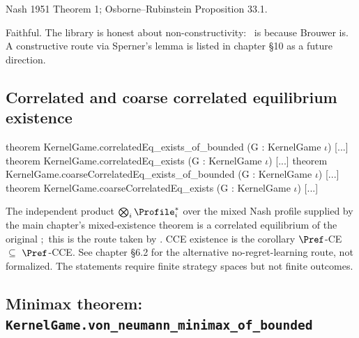 \Textbook
Nash 1951 Theorem 1; Osborne–Rubinstein Proposition 33.1.

\Faithfulness
Faithful.  The library is honest about non-constructivity:\
 is  because Brouwer is.
A constructive route via Sperner's lemma is listed in chapter
§10 as a future direction.

\subsection{Correlated and coarse correlated equilibrium existence}
\label{sec:supp:ce-exists}\label{def:correlatedEq_exists}

\begin{leanbox}
theorem KernelGame.correlatedEq\_exists\_of\_bounded       (G : KernelGame $\iota$) [...]
theorem KernelGame.correlatedEq\_exists                   (G : KernelGame $\iota$) [...]
theorem KernelGame.coarseCorrelatedEq\_exists\_of\_bounded (G : KernelGame $\iota$) [...]
theorem KernelGame.coarseCorrelatedEq\_exists             (G : KernelGame $\iota$) [...]
\end{leanbox}

The independent product
$\bigotimes_i \Profile^*_i$ over the mixed Nash profile supplied by
the main chapter's mixed-existence theorem is a correlated equilibrium
of the original \KG;\ this is the route taken by
.  CCE existence is the
corollary $\Pref$-CE $\subseteq$ $\Pref$-CCE.  See chapter §6.2
for the alternative no-regret-learning route, not formalized.  The
\TT{\_of\_bounded} statements require finite strategy spaces but
not finite outcomes.

\subsection{Minimax theorem: \texttt{KernelGame.von\_neumann\_minimax\_of\_bounded}}
\label{sec:supp:minimax}\label{def:von_neumann_minimax}

